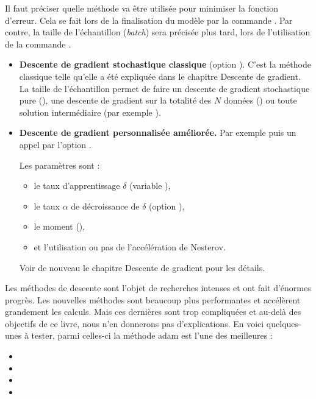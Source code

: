 \documentclass[11pt,class=report,crop=false]{standalone}
\begin{document}

Il faut préciser quelle méthode va être utilisée pour minimiser la fonction d'erreur. Cela se fait lors de la finalisation du modèle par la commande . Par contre, la taille de l'échantillon (\emph{batch}) sera précisée plus tard, lors de l'utilisation de la commande .

\begin{itemize}
  \item \textbf{Descente de gradient stochastique classique} (option ). C'est la méthode classique telle qu'elle a été expliquée dans le chapitre \og{}Descente de gradient\fg{}. 
  La taille de l'échantillon permet de faire un descente de gradient stochastique pure 
  (), une descente de gradient sur la totalité des $N$ données ()
  ou toute solution intermédiaire (par exemple ).

  \item \textbf{Descente de gradient personnalisée améliorée.}
  Par exemple 
  puis un appel par l'option .
 
  Les paramètres sont :
  \begin{itemize} 
    \item le taux d'apprentissage $\delta$ (variable ),
    \item le taux $\alpha$ de décroissance de $\delta$ (option ),
    \item le moment (),
    \item et l'utilisation ou pas de l'accélération de Nesterov.
  \end{itemize}
  Voir de nouveau le chapitre \og{}Descente de gradient\fg{} pour les détails.
\end{itemize}  
  

Les méthodes de descente sont l'objet de recherches intenses et ont fait d'énormes progrès.
Les nouvelles méthodes sont beaucoup plus performantes et accélèrent grandement les calculs. Mais ces dernières sont trop compliquées et au-delà des objectifs de ce livre, nous n'en donnerons pas d'explications. En voici quelques-unes à tester, parmi celles-ci la méthode \og{}adam\fg{} est l'une des meilleures :
\begin{itemize}
  \item {}
  \item {}
  \item {}  
  \item {}  
\end{itemize}  
\end{document}
